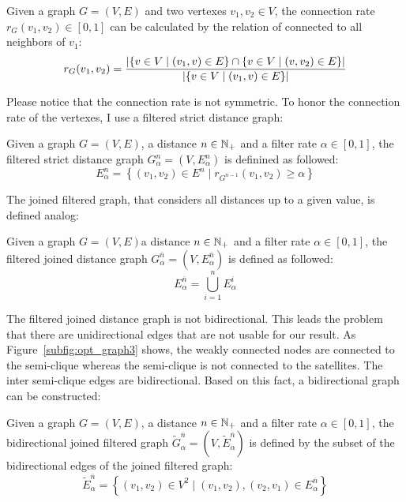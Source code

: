 \begin{envdef}
	Given a graph $G=(V,E)$ and two vertexes $v_1,v_2 \in V$, the connection rate $r_G(v_1,v_2) \in \left[0,1\right]$ can be calculated by the relation of connected to all neighbors of $v_1$:
	\begin{equation}
		r_G(v_1,v_2) = \frac{
			\left| \left\{ v \in V \mid (v_1, v) \in E \right\} \cap \left\{ v \in V \mid (v,v_2) \in E \right\} \right|
		}{
			\left| \left\{ v \in V \mid (v_1, v) \in E \right\} \right|
		}
	\end{equation}
\end{envdef}
Please notice that the connection rate is not symmetric. To honor the connection rate of the vertexes, I use a filtered strict distance graph:
\begin{envdef}
	Given a graph $G=(V,E)$, a distance $n \in \mathbb{N}_+$ and a filter rate $\alpha \in \left[0,1\right]$, the filtered strict distance graph $G_\alpha^n=(V,E_\alpha^n)$ is definined as followed:
	\begin{equation}
		E_\alpha^n = \left\{ (v_1,v_2) \in E^n \mid r_{G^{n-1}}(v_1,v_2) \geq \alpha \right\}
	\end{equation}
\end{envdef}
The joined filtered graph, that considers all distances up to a given value, is defined analog:
\begin{envdef}
	Given a graph $G=(V,E)$a distance $n \in \mathbb{N}_+$ and a filter rate $\alpha \in \left[0,1\right]$, the filtered joined distance graph $G_\alpha^{\overline{n}}=(V,E_\alpha^{\overline{n}})$ is defined as followed:
	\begin{equation}
		E_\alpha^{\overline{n}} = \bigcup_{i=1}^n E_\alpha^i
	\end{equation}
\end{envdef}
The filtered joined distance graph is not bidirectional. This leads the problem that there are unidirectional edges that are not usable for our result. As Figure~\ref{subfig:opt_graph3} shows, the weakly connected nodes are connected to the semi-clique whereas the semi-clique is not connected to the satellites. The inter semi-clique edges are bidirectional. Based on this fact, a bidirectional graph can be constructed:
\begin{envdef}
	Given a graph $G=(V,E)$, a distance $n \in \mathbb{N}_+$ and a filter rate $\alpha \in \left[0,1\right]$, the bidirectional joined filtered graph $\tilde{G}_\alpha^{\overline{n}}=(V,\tilde{E}_\alpha^{\overline{n}})$ is defined by the subset of the bidirectional edges of the joined filtered graph:
	\begin{equation}
		\tilde{E}_\alpha^{\overline{n}} = \left\{ (v_1,v_2) \in V^2 \mid (v_1,v_2),(v_2,v_1) \in E_\alpha^{\overline{n}} \right\}
	\end{equation}
\end{envdef}
